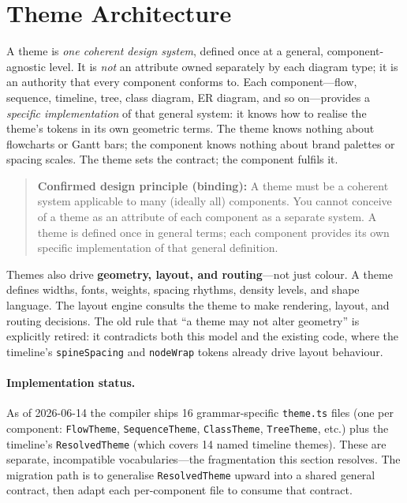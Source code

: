 \section{Theme Architecture}
\label{sec:themes}

A theme is \emph{one coherent design system}, defined once at a general, component-agnostic
level. It is \emph{not} an attribute owned separately by each diagram type; it is an
authority that every component conforms to. Each component---flow, sequence, timeline, tree,
class diagram, ER diagram, and so on---provides a \emph{specific implementation} of that
general system: it knows how to realise the theme's tokens in its own geometric terms. The
theme knows nothing about flowcharts or Gantt bars; the component knows nothing about brand
palettes or spacing scales. The theme sets the contract; the component fulfils it.

\begin{quote}
\textbf{Confirmed design principle (binding):} A theme must be a coherent system applicable
to many (ideally all) components. You cannot conceive of a theme as an attribute of each
component as a separate system. A theme is defined once in general terms; each component
provides its own specific implementation of that general definition.
\end{quote}

Themes also drive \textbf{geometry, layout, and routing}---not just colour. A theme defines
widths, fonts, weights, spacing rhythms, density levels, and shape language. The layout
engine consults the theme to make rendering, layout, and routing decisions. The old rule that
``a theme may not alter geometry'' is explicitly retired: it contradicts both this model and
the existing code, where the timeline's \texttt{spineSpacing} and \texttt{nodeWrap} tokens
already drive layout behaviour.

\paragraph{Implementation status.}
As of 2026-06-14 the compiler ships 16 grammar-specific \texttt{theme.ts} files (one per
component: \texttt{FlowTheme}, \texttt{SequenceTheme}, \texttt{ClassTheme},
\texttt{TreeTheme}, etc.) plus the timeline's \texttt{ResolvedTheme} (which covers 14 named
timeline themes). These are separate, incompatible vocabularies---the fragmentation this
section resolves. The migration path is to generalise \texttt{ResolvedTheme} upward into a
shared general contract, then adapt each per-component file to consume that contract.

